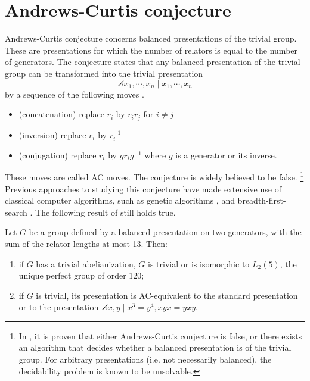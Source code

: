 
\section{Andrews-Curtis conjecture\label{sec:AC}}

Andrews-Curtis conjecture concerns balanced presentations
of the trivial group.
These are presentations for which the number of relators is
equal to the number of generators.
The conjecture states that any balanced presentation of the trivial group can be transformed into the trivial presentation
\[
\angles{x_1, \cdots, x_n \mid x_1, \cdots, x_n}
\]
by a sequence of the following moves \cite{Andrews-Curtis}.

\begin{itemize}
	\item (concatenation) replace $r_i$ by $r_i r_j$ for $i \neq j$
	\item (inversion) replace $r_i$ by $r_i^{-1}$
	\item (conjugation) replace $r_i$ by $g r_i g^{-1}$ where $g$ is a generator or its inverse.
\end{itemize}

These moves are called AC moves.
The conjecture is widely believed to be false.
\footnote{In \cite{decidability}, it is proven that either Andrews-Curtis conjecture is false, or there exists an algorithm that decides whether a balanced presentation is of the trivial group.
For arbitrary presentations (i.e. not necessarily balanced), the decidability problem is known to be unsolvable.
}
Previous approaches to studying this conjecture have made extensive use of classical computer algorithms, such as genetic algorithms \cite{genetic}, and breadth-first-search  \cite{bfs-ac}.
The following result of \cite{bfs-ac} still holds true.

\begin{theorem}
	Let $G$ be a group defined by a balanced presentation on two generators, with the sum
	of the relator lengths at most 13.
	Then:
	\begin{enumerate}[label=(\roman*)]
		\item if $G$ has a trivial abelianization, $G$ is trivial or is isomorphic to $L_2(5)$, the unique perfect
		group of order 120;
		\item if $G$ is trivial, its presentation is AC-equivalent to the standard presentation or to the presentation
		$\angles{x, y \mid x^3 = y^4, xyx = yxy}$.
	\end{enumerate}
\end{theorem}

